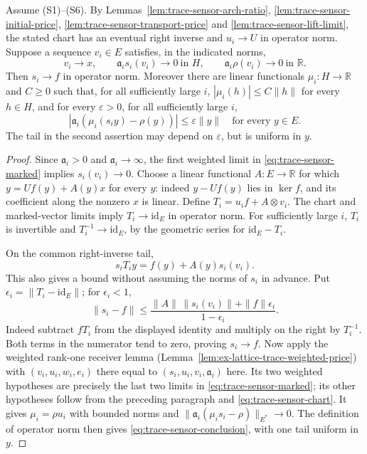 \begin{proposition}
\label{prop:trace-prosper-sensor}
Assume (S1)--(S6). By Lemmas~\ref{lem:trace-sensor-arch-ratio},
\ref{lem:trace-sensor-initial-price}, \ref{lem:trace-sensor-transport-price}
and \ref{lem:trace-sensor-lift-limit}, the stated chart has an eventual
right inverse and $u_i\to U$ in operator norm.
Suppose a sequence $v_i\in E$
satisfies, in the indicated norms,
\begin{equation}
 v_i\longrightarrow x,\qquad
 \mathfrak a_i s_i(v_i)\longrightarrow0\ \text{in }H,\qquad
 \mathfrak a_i\rho(v_i)\longrightarrow0\ \text{in }\mathbb R.
 \label{eq:trace-sensor-marked}
\end{equation}
Then $s_i\to f$ in operator norm. Moreover there are linear functionals
$\mu_i:H\to\mathbb R$ and $C\ge0$ such that, for all sufficiently large
$i$, $|\mu_i(h)|\le C\|h\|$ for every $h\in H$, and for every
$\varepsilon>0$, for all sufficiently large $i$,
\begin{equation}
 |\mathfrak a_i(\mu_i(s_i y)-\rho(y))|\le\varepsilon\|y\|
 \quad\text{for every }y\in E.
 \label{eq:trace-sensor-conclusion}
\end{equation}
The tail in the second assertion may depend on $\varepsilon$, but is uniform
in $y$.
\end{proposition}
\begin{proof}
Since $\mathfrak a_i>0$ and $\mathfrak a_i\to\infty$, the first weighted limit in
\eqref{eq:trace-sensor-marked} implies $s_i(v_i)\to0$. Choose a linear
functional $A:E\to\mathbb R$ for which
$y=Uf(y)+A(y)x$ for every $y$: indeed $y-Uf(y)$ lies in $\ker f$, and its
coefficient along the nonzero $x$ is linear. Define
$T_i=u_i f+A\otimes v_i$. The chart and marked-vector limits imply
$T_i\to\mathrm{id}_E$ in operator norm. For sufficiently large $i$, $T_i$
is invertible and $T_i^{-1}\to\mathrm{id}_E$, by the geometric series for
$\mathrm{id}_E-T_i$.

On the common right-inverse tail,
\[
 s_iT_i y=f(y)+A(y)s_i(v_i).
\]
This also gives a bound without assuming the norms of $s_i$ in advance.
Put $\epsilon_i=\|T_i-\mathrm{id}_E\|$; for $\epsilon_i<1$,
\[
 \|s_i-f\|\le
 \frac{\|A\|\,\|s_i(v_i)\|+\|f\|\epsilon_i}{1-\epsilon_i}.
\]
Indeed subtract $fT_i$ from the displayed identity and multiply on the
right by $T_i^{-1}$. Both terms in the numerator tend to zero, proving
$s_i\to f$. Now apply the weighted rank-one
receiver lemma (Lemma~\ref{lem:ex-lattice-trace-weighted-price}) with
$(v_i,u_i,w_i,e_i)$ there equal to $(s_i,u_i,v_i,\mathfrak a_i)$ here. Its two
weighted hypotheses are precisely the last two limits in
\eqref{eq:trace-sensor-marked}; its other hypotheses follow from the
preceding paragraph and \eqref{eq:trace-sensor-chart}. It gives
$\mu_i=\rho u_i$ with bounded norms and
$\|\mathfrak a_i(\mu_i s_i-\rho)\|_{E^*}\to0$. The definition of operator norm
then gives \eqref{eq:trace-sensor-conclusion}, with one tail uniform in $y$.
\end{proof}


